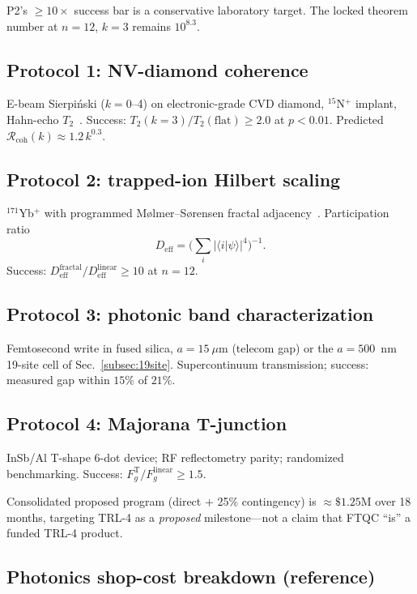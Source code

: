 \documentclass[aps,prx,twocolumn,superscriptaddress,floatfix]{revtex4-2}
\theoremstyle{plain}
\theoremstyle{definition}
\begin{document}
P2's $\geq 10\times$ success bar is a conservative laboratory target. The locked theorem number at $n=12$, $k=3$ remains $10^{8.3}$.

\subsection{Protocol 1: NV-diamond coherence}

E-beam Sierpi\'{n}ski ($k=0$--4) on electronic-grade CVD diamond, $^{15}$N$^+$ implant, Hahn-echo $T_2$~\cite{Childress2006,Doherty2013}. Success: $T_2(k=3)/T_2(\mathrm{flat})\geq 2.0$ at $p<0.01$. Predicted $\mathcal{R}_{\mathrm{coh}}(k)\approx 1.2\,k^{0.3}$.

\subsection{Protocol 2: trapped-ion Hilbert scaling}

$^{171}$Yb$^+$ with programmed M{\o}lmer--S{\o}rensen fractal adjacency~\cite{Monroe2013,Blatt2012}. Participation ratio
\begin{equation}
D_{\mathrm{eff}} = \bigl(\textstyle\sum_i |\langle i|\psi\rangle|^4\bigr)^{-1}.
\end{equation}
Success: $D_{\mathrm{eff}}^{\mathrm{fractal}}/D_{\mathrm{eff}}^{\mathrm{linear}}\geq 10$ at $n=12$.

\subsection{Protocol 3: photonic band characterization}

Femtosecond write in fused silica, $a=15~\mu$m (telecom gap) or the $a=500$~nm 19-site cell of Sec.~\ref{subsec:19site}. Supercontinuum transmission; success: measured gap within $15\%$ of $21\%$.

\subsection{Protocol 4: Majorana T-junction}

InSb/Al T-shape 6-dot device; RF reflectometry parity; randomized benchmarking. Success: $F_g^{\mathrm{T}}/F_g^{\mathrm{linear}}\geq 1.5$.

Consolidated proposed program (direct + 25\% contingency) is $\approx\$1.25$M over 18 months, targeting TRL-4 as a \emph{proposed} milestone---not a claim that FTQC ``is'' a funded TRL-4 product.

\subsection{Photonics shop-cost breakdown (reference)}
\label{subsec:photonics-budget}
\end{document}

